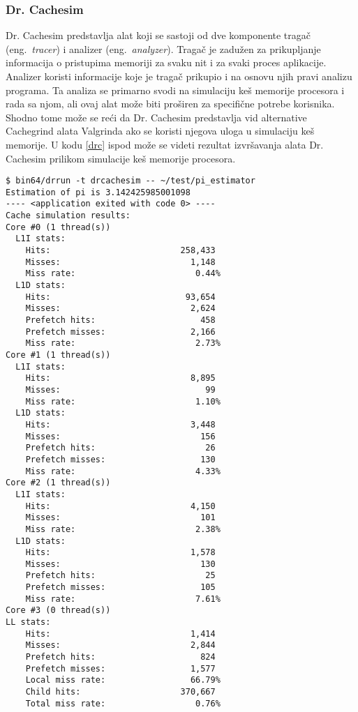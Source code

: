 \documentclass[a4paper]{article}
\begin{document}
\subsubsection{Dr. Cachesim}
Dr. Cachesim predstavlja alat koji se sastoji od dve komponente tragač (eng.~{\em tracer}) i analizer (eng.~{\em analyzer}). Tragač je zadužen za prikupljanje informacija o pristupima memoriji za svaku nit i za svaki proces aplikacije. Analizer koristi informacije koje je tragač prikupio i na osnovu njih pravi analizu programa. Ta analiza se primarno svodi na simulaciju keš memorije procesora i rada sa njom, ali ovaj alat može biti proširen za specifične potrebe korisnika. Shodno tome može se reći da Dr. Cachesim predstavlja vid alternative Cachegrind alata Valgrinda ako se koristi njegova uloga u simulaciju keš memorije. U kodu \ref{drc} ispod može se videti rezultat izvršavanja alata Dr. Cachesim prilikom simulacije keš memorije procesora. \cite{drcasesim-doc}
\begin{lstlisting}[caption={Primer rezultata izvršavanja Dr. Cachesim alata \cite{drcasesim-doc}},frame=single, label=drc]
$ bin64/drrun -t drcachesim -- ~/test/pi_estimator
Estimation of pi is 3.142425985001098
---- <application exited with code 0> ----
Cache simulation results:
Core #0 (1 thread(s))
  L1I stats:
    Hits:                          258,433
    Misses:                          1,148
    Miss rate:                        0.44%
  L1D stats:
    Hits:                           93,654
    Misses:                          2,624
    Prefetch hits:                     458
    Prefetch misses:                 2,166
    Miss rate:                        2.73%
Core #1 (1 thread(s))
  L1I stats:
    Hits:                            8,895
    Misses:                             99
    Miss rate:                        1.10%
  L1D stats:
    Hits:                            3,448
    Misses:                            156
    Prefetch hits:                      26
    Prefetch misses:                   130
    Miss rate:                        4.33%
Core #2 (1 thread(s))
  L1I stats:
    Hits:                            4,150
    Misses:                            101
    Miss rate:                        2.38%
  L1D stats:
    Hits:                            1,578
    Misses:                            130
    Prefetch hits:                      25
    Prefetch misses:                   105
    Miss rate:                        7.61%
Core #3 (0 thread(s))
LL stats:
    Hits:                            1,414
    Misses:                          2,844
    Prefetch hits:                     824
    Prefetch misses:                 1,577
    Local miss rate:                 66.79%
    Child hits:                    370,667
    Total miss rate:                  0.76%
\end{lstlisting}
\end{document}
